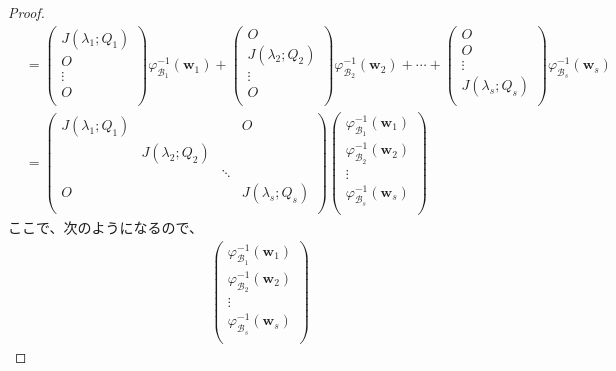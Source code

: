 \documentclass[dvipdfmx]{jsarticle}
\begin{document}
\begin{proof}
\begin{align*}
&= \begin{pmatrix}
J\left( \lambda_{1};Q_{1} \right) \\
O \\
 \vdots \\
O \\
\end{pmatrix}\varphi_{\mathcal{B}_{1}}^{- 1}\left( \mathbf{w}_{1} \right) + \begin{pmatrix}
O \\
J\left( \lambda_{2};Q_{2} \right) \\
 \vdots \\
O \\
\end{pmatrix}\varphi_{\mathcal{B}_{2}}^{- 1}\left( \mathbf{w}_{2} \right) + \cdots + \begin{pmatrix}
O \\
O \\
 \vdots \\
J\left( \lambda_{s};Q_{s} \right) \\
\end{pmatrix}\varphi_{\mathcal{B}_{s}}^{- 1}\left( \mathbf{w}_{s} \right)\\
&= \begin{pmatrix}
J\left( \lambda_{1};Q_{1} \right) & \  & \  & O \\
\  & J\left( \lambda_{2};Q_{2} \right) & \  & \  \\
\  & \  & \ddots & \  \\
O & \  & \  & J\left( \lambda_{s};Q_{s} \right) \\
\end{pmatrix}\begin{pmatrix}
\varphi_{\mathcal{B}_{1}}^{- 1}\left( \mathbf{w}_{1} \right) \\
\varphi_{\mathcal{B}_{2}}^{- 1}\left( \mathbf{w}_{2} \right) \\
 \vdots \\
\varphi_{\mathcal{B}_{s}}^{- 1}\left( \mathbf{w}_{s} \right) \\
\end{pmatrix}
\end{align*}
ここで、次のようになるので、
\begin{align*}
\begin{pmatrix}
\varphi_{\mathcal{B}_{1}}^{- 1}\left( \mathbf{w}_{1} \right) \\
\varphi_{\mathcal{B}_{2}}^{- 1}\left( \mathbf{w}_{2} \right) \\
 \vdots \\
\varphi_{\mathcal{B}_{s}}^{- 1}\left( \mathbf{w}_{s} \right) \\

\end{pmatrix}
\end{align*}
\end{proof}
\end{document}
